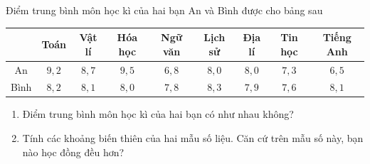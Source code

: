 \begin{bt}%
	Điểm trung bình môn học kì của hai bạn An và Bình được cho bảng sau 
	\begin{center}
		\begin{tabular}{|c|c|c|c|c|c|c|c|c|}
			\hline
			& Toán & Vật lí & Hóa học & Ngữ văn & Lịch sử & Địa lí & Tin học & Tiếng Anh \\
			\hline
			An & $9{,}2$ & $8{,}7$ & $9{,}5$ & $6{,}8$ & $8{,}0$ & $8{,}0$ & $7{,}3$ & $6{,}5$ \\
			\hline
			Bình & $8{,}2$ & $8{,}1$ & $8{,}0$ & $7{,}8$ & $8{,}3$ & $7{,}9$ & $7{,}6$ & $8{,}1$ \\
			\hline
		\end{tabular}
	\end{center}
	
	\begin{enumerate}
		\item Điểm trung bình môn học kì của hai bạn có như nhau không?
		\item Tính các khoảng biến thiên của hai mẫu số liệu. Căn cứ trên mẫu số này, bạn nào học đồng đều hơn?
	\end{enumerate}
\end{bt}

